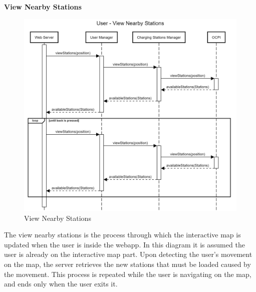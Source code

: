 \documentclass[table, 12pt]{article}
\begin{document}
\textbf{View Nearby Stations}
\begin{center}
    \begin{figure}[H]
        \includegraphics[scale=0.15, center]{assets/sequenceDiagrams/User View Nearby Stations.png}
        \caption{View Nearby Stations}
        \label{View Nearby Stations}
    \end{figure}
\end{center}
The view nearby stations is the process through which the interactive map is updated when the user is inside the webapp. In this diagram it is assumed the user is already on the interactive map part.
Upon detecting the user's movement on the map, the server retrieves the new stations that must be loaded caused by the movement. This process is repeated while the user is navigating on the map, and ends only when the user exits it.
\end{document}
